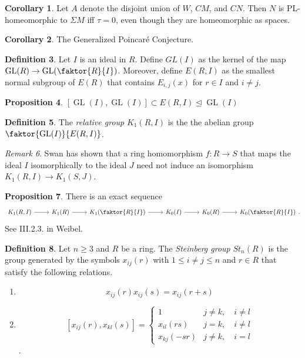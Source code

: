\documentclass[10pt,letterpaper,cm]{nupset}
\theoremstyle{definition}
\newtheorem{definition}{Definition}
\theoremstyle{theorem}
\newtheorem{prop}[definition]{Proposition}
\newtheorem{corollary}[definition]{Corollary}
\theoremstyle{remark}
\newtheorem{remark}[definition]{Remark}
\newcommand{\1}{\mathbf{1}}
\newcommand{\0}{\vec 0}
\DeclareMathOperator*{\GL}{GL}
\begin{document}
\begin{corollary}
Let $A$ denote the disjoint union of $W$, $CM$, and $CN$. Then $N$ is PL-homeomorphic to $\Sigma M$ iff $\tau = 0$, even though they are homeomorphic as spaces.
\end{corollary}

\begin{corollary}
The Generalized Poincar\'e Conjecture.
\end{corollary}

\begin{definition}
Let $I$ is an ideal in $R$. Define $GL(I)$ as the kernel of the map $\GL(R) \to \GL(\faktor{R}{I})$. Moreover, define $E(R, I)$ as the smallest normal subgroup of $E(R)$ that contains $E_{i, j}(x)$ for $r\in I$ and $i\ne j$.
\end{definition}

\begin{prop}
$[\GL(I), \GL(I)] \subset E(R, I)\unlhd \GL(I)$
\end{prop}

\begin{definition}
The \textit{relative group} $K_1(R, I)$ is the the abelian group $\faktor{\GL(I)}{E(R, I)}$.
\end{definition}

\begin{remark}
Swan has shown that a ring homomorphism $f: R\to S$ that maps the ideal $I$ isomorphically to the ideal $J$ need not induce an isomorphism $K_1(R, I) \to K_1(S, J)$.
\end{remark}

\begin{prop}
There is an exact sequence 
\[
\begin{tikzcd}
{K_1(R, I)} \arrow[r] & K_1(R) \arrow[r] & K_1(\faktor{R}{I}) \arrow[r] & K_0(I) \arrow[r] & K_0(R) \arrow[r] & K_0(\faktor{R}{I})
\end{tikzcd}.
\] See III.2.3. in Weibel.
\end{prop}

\begin{definition}
Let $n\geq 3$ and $R$ be a ring. The \textit{Steinberg group} $St_n(R)$ is the group generated by the symbols $x_{ij}(r)$ with $1\leq i\ne j\leq n$ and $r\in R$ that satisfy the following relations.
\begin{enumerate}
\item $$x_{ij}(r)x_{ij}(s) = x_{ij}(r+s)$$
\item 
\[ [x_{ij}(r), x_{kl}(s)] = 
\begin{cases}
1 & j\ne k, \quad i\ne l \\
x_{il}(rs) & j= k, \quad i\ne l \\
x_{kj}(-sr) & j \ne k, \quad i=l
\end{cases} \].
\end{enumerate}
\end{definition}
\end{document}
